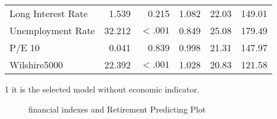 \documentclass[12pt,letterpaper]{article}
\begin{document}
\begin{table}[h!]
\begin{threeparttable}
\begin{tabular}{L{3cm}rrrrr}
			Long Interest Rate & 1.539 & 0.215 & 1.082 & 22.03 & 149.01 \\
			Unemployment Rate & 32.212 & $<.001$ & 0.849 & 25.08 & 179.49 \\
			P/E 10 & 0.041 & 0.839 & 0.998 & 21.31 & 147.97 \\
			Wilshire5000 & 22.392 & $<.001$ & 1.028 & 20.83 & 121.58 \\
			\bottomrule
		\end{tabular}%
		\begin{tablenotes}
		\item[1] it is the selected model without economic indicator.
		\end{tablenotes}
		\end{threeparttable}
		\label{tab:EI}%
	\end{table}%
	   \begin{figure}[h!]
	   	\centering
	   	\caption{financial indexes and Retirement Predicting Plot}
	   	\label{fig:EIndex}
	   \end{figure}
	
\end{document}
